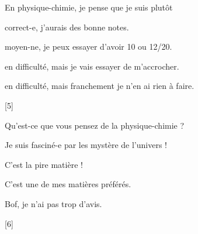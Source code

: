 \nomPrenom
\medskip

\begin{qcm}{En physique-chimie, je pense que je suis plutôt}
  \item correct-e, j'aurais des bonne notes.
  \item moyen-ne, je peux essayer d'avoir 10 ou 12/20.
  \item en difficulté, mais je vais essayer de m'accrocher.
  \item en difficulté, mais franchement je n'en ai rien à faire.
\end{qcm}

[5]

\begin{qcm}{Qu'est-ce que vous pensez de la physique-chimie ?}
  \item Je suis fasciné-e par les mystère de l'univers !
  \item C'est la pire matière !
  \item C'est une de mes matières préférés.
  \item Bof, je n'ai pas trop d'avis.
\end{qcm}

[6]
